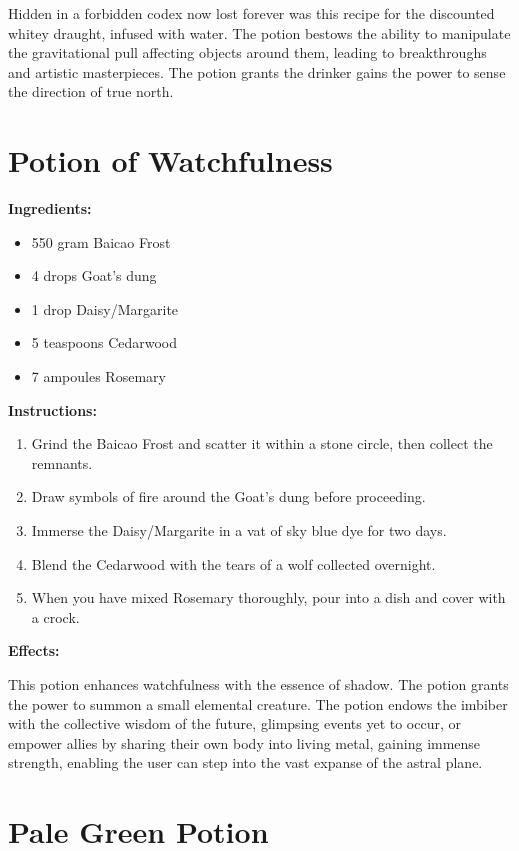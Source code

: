 \documentclass{article}
\begin{document}
Hidden in a forbidden codex now lost forever was this recipe for the discounted whitey draught, infused with water. The potion bestows the ability to manipulate the gravitational pull affecting objects around them, leading to breakthroughs and artistic masterpieces. The potion grants the drinker gains the power to sense the direction of true north.

\newpage
\section*{Potion of Watchfulness}

\textbf{Ingredients:}

\begin{itemize}
  \item 550 gram Baicao Frost
  \item 4 drops Goat's dung
  \item 1 drop Daisy/Margarite
  \item 5 teaspoons Cedarwood
  \item 7 ampoules Rosemary
\end{itemize}

\textbf{Instructions:}

\begin{enumerate}
  \item Grind the Baicao Frost and scatter it within a stone circle, then collect the remnants.
  \item Draw symbols of fire around the Goat's dung before proceeding.
  \item Immerse the Daisy/Margarite in a vat of sky blue dye for two days.
  \item Blend the Cedarwood with the tears of a wolf collected overnight.
  \item When you have mixed Rosemary thoroughly, pour into a dish and cover with a crock.
\end{enumerate}

\textbf{Effects:}

This potion enhances watchfulness with the essence of shadow. The potion grants the power to summon a small elemental creature. The potion endows the imbiber with the collective wisdom of the future, glimpsing events yet to occur, or empower allies by sharing their own body into living metal, gaining immense strength, enabling the user can step into the vast expanse of the astral plane.

\newpage
\section*{Pale Green Potion}
\end{document}

